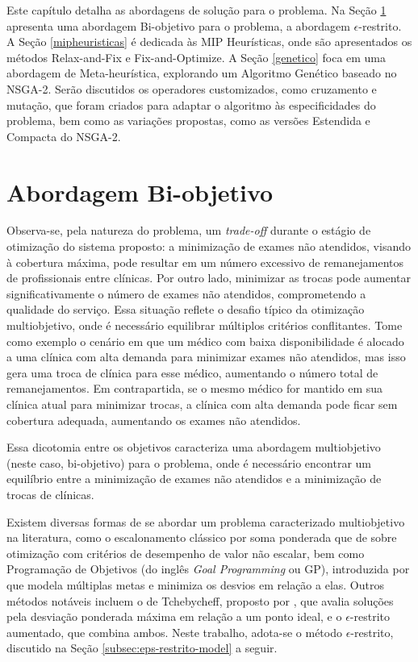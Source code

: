 \label{cap:mip-heuristicas}

Este capítulo detalha as abordagens de solução para o problema. Na Seção \ref{biojetivo} apresenta uma abordagem  Bi-objetivo para o problema, a abordagem $\epsilon$-restrito.  A Seção \ref{mipheuristicas}  é dedicada às MIP Heurísticas, onde são apresentados os métodos Relax-and-Fix e Fix-and-Optimize. A Seção \ref{genetico} foca em uma abordagem de Meta-heurística, explorando um Algoritmo Genético baseado no NSGA-2. Serão discutidos os operadores customizados, como cruzamento e mutação, que foram criados para adaptar o algoritmo às especificidades do problema, bem como as variações propostas, como as versões Estendida e Compacta do NSGA-2.

\section{Abordagem Bi-objetivo}\label{biojetivo}

Observa-se, pela natureza do problema, um \textit{trade-off} durante o estágio de otimização do sistema proposto: a minimização de exames não atendidos, visando à cobertura máxima, pode resultar em um número excessivo de remanejamentos de profissionais entre clínicas. Por outro lado, minimizar as trocas pode aumentar significativamente o número de exames não atendidos, comprometendo a qualidade do serviço. Essa situação reflete o desafio típico da otimização multiobjetivo, onde é necessário equilibrar múltiplos critérios conflitantes.
Tome como exemplo o cenário em que um médico com baixa disponibilidade é alocado a uma clínica com alta demanda para minimizar exames não atendidos, mas isso gera uma troca de clínica para esse médico, aumentando o número total de remanejamentos. Em contrapartida, se o mesmo médico for mantido em sua clínica atual para minimizar trocas, a clínica com alta demanda pode ficar sem cobertura adequada, aumentando os exames não atendidos.

Essa dicotomia entre os objetivos caracteriza uma abordagem multiobjetivo (neste caso, bi-objetivo) para o problema, onde é necessário encontrar um equilíbrio entre a minimização de exames não atendidos e a minimização de trocas de clínicas.

Existem diversas formas de se abordar um problema caracterizado multiobjetivo na literatura, como o escalonamento clássico por soma ponderada que de  sobre otimização com critérios de desempenho de valor não escalar, bem como Programação de Objetivos (do inglês \textit{Goal Programming} ou GP), introduzida por  que modela múltiplas metas e minimiza os desvios em relação a elas. Outros métodos notáveis incluem o de Tchebycheff, proposto por , que avalia soluções pela desviação ponderada máxima em relação a um ponto ideal, e o $\epsilon$-restrito aumentado, que combina ambos. Neste trabalho, adota-se o método $\epsilon$-restrito, discutido na Seção \ref{subsec:eps-restrito-model} a seguir.

